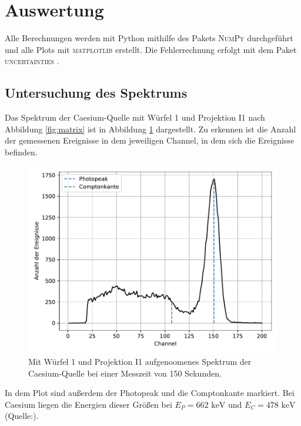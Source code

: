 \newpage
\section{Auswertung}
\label{sec:Auswertung}

\noindent
Alle Berechnungen werden mit Python mithilfe des Pakets \textsc{NumPy} \cite{numpy} durchgeführt und alle Plots mit \textsc{matplotlib} \cite{matplotlib} erstellt.
Die Fehlerrechnung erfolgt mit dem Paket \textsc{uncertainties} \cite{uncertainties}.

\subsection{Untersuchung des Spektrums}

\noindent
Das Spektrum der Caesium-Quelle mit Würfel 1 und Projektion I1 nach Abbildung \ref{fig:matrix} ist in Abbildung \ref{fig:spektrum} dargestellt. 
Zu erkennen ist die Anzahl der gemessenen Ereignisse in dem jeweiligen Channel, in dem sich die Ereignisse befinden.

\begin{figure}
  \centering
  \includegraphics[width=\textwidth]{data/spektrum.pdf}
  \caption{Mit Würfel 1 und Projektion I1 aufgenoomenes Spektrum der Caesium-Quelle bei einer Messzeit von 150 Sekunden.}
  \label{fig:spektrum}
\end{figure}

\noindent
In dem Plot sind außerdem der Photopeak und die Comptonkante markiert.
Bei Caesium liegen die Energien dieser Größen bei $E_{P} = 662 \text{ keV}$ und $E_{C} = 478 \text{ keV}$ (Quelle:\cite{energien}).

